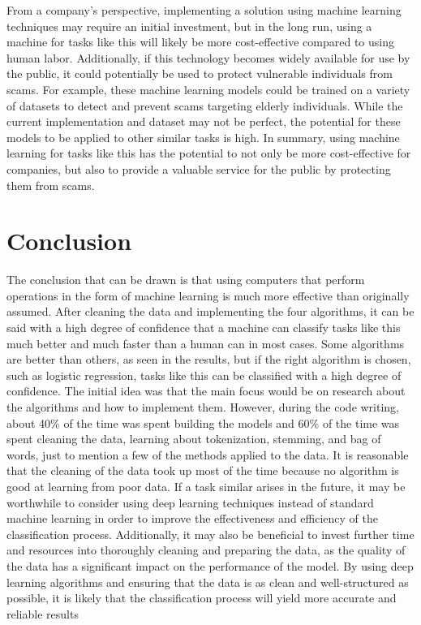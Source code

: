 \documentclass[conference]{IEEEtran}
\begin{document}
\newline
\newline
From a company's perspective, implementing a solution using machine learning techniques may require an initial investment, but in the long run, using a machine for tasks like this will likely be more cost-effective compared to using human labor. Additionally, if this technology becomes widely available for use by the public, it could potentially be used to protect vulnerable individuals from scams. For example, these machine learning models could be trained on a variety of datasets to detect and prevent scams targeting elderly individuals. While the current implementation and dataset may not be perfect, the potential for these models to be applied to other similar tasks is high. In summary, using machine learning for tasks like this has the potential to not only be more cost-effective for companies, but also to provide a valuable service for the public by protecting them from scams.

\section{Conclusion}
The conclusion that can be drawn is that using computers that perform operations in the form of machine learning is much more effective than originally assumed. After cleaning the data and implementing the four algorithms, it can be said with a high degree of confidence that a machine can classify tasks like this much better and much faster than a human can in most cases. Some algorithms are better than others, as seen in the results, but if the right algorithm is chosen, such as logistic regression, tasks like this can be classified with a high degree of confidence. The initial idea was that the main focus would be on research about the algorithms and how to implement them. However, during the code writing, about 40\% of the time was spent building the models and 60\% of the time was spent cleaning the data, learning about tokenization, stemming, and bag of words, just to mention a few of the methods applied to the data. It is reasonable that the cleaning of the data took up most of the time because no algorithm is good at learning from poor data. If a task similar arises in the future, it may be worthwhile to consider using deep learning techniques instead of standard machine learning in order to improve the effectiveness and efficiency of the classification process. Additionally, it may also be beneficial to invest further time and resources into thoroughly cleaning and preparing the data, as the quality of the data has a significant impact on the performance of the model. By using deep learning algorithms and ensuring that the data is as clean and well-structured as possible, it is likely that the classification process will yield more accurate and reliable results
\end{document}
